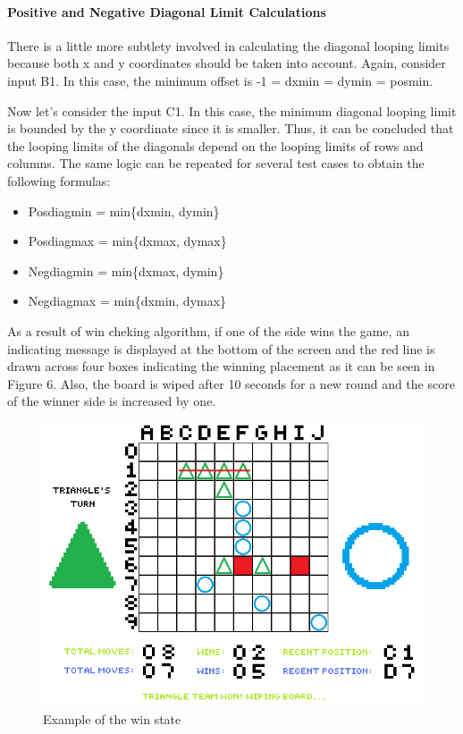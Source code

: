 \documentclass[conference]{IEEEtran}
\begin{document}
\paragraph{Positive and Negative Diagonal Limit Calculations}
There is a little more subtlety involved in calculating the diagonal looping limits because both x and y coordinates should be taken into account. Again, consider input B1. In this case, the minimum offset is -1 = dxmin = dymin = posmin. \\ 
\par Now let’s consider the input C1. In this case, the minimum diagonal looping limit is bounded by the y coordinate since it is smaller. Thus, it can be concluded that the looping limits of the diagonals depend on the looping limits of rows and columns. The same logic can be repeated for several test cases to obtain the following formulas:
\begin{itemize}
\item Posdiagmin = min\{dxmin, dymin\}
\item Posdiagmax = min\{dxmax, dymax\}
\item Negdiagmin = min\{dxmax, dymin\}
\item Negdiagmax = min\{dxmin, dymax\}
\end{itemize} \hfill \hfill
\par As a result of win cheking algorithm, if one of the side wins the game, an indicating message is displayed at the bottom of the screen and the red line is drawn across four boxes indicating the winning placement as it can be seen in Figure 6. Also, the board is wiped after 10 seconds for a new round and the score of the winner side is increased by one. 
\begin{figure}[H]
  \centerline{\includegraphics[scale=0.65, frame]{sample_board_2.png}}
   \caption{Example of the win state}
\end{figure} 
\end{document}
